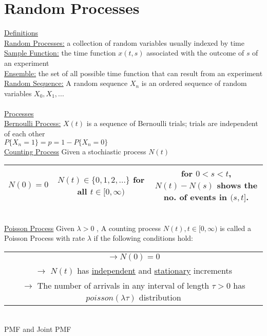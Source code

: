 \documentclass{article}
\begin{document}
	\section*{Random Processes}
	\underline{Definitions}
	\\
	\underline{Random Processes:} a collection of random variables usually indexed by time
	\\
	\underline{Sample Function:} the time function  $x(t, s)$ associated with the outcome of $s$ of an experiment
	\\
	\underline{Ensemble:} the set of all possible time function that can result from an experiment
	\\
	\underline{Random Sequence:} A random sequence $X_n$ is an ordered sequence of random variables $X_0, X_1, ...$ 
	\\
	\\
	\underline{Processes}
	\\
	\underline{Bernoulli Process:} $X(t)$ is a sequence of Bernoulli trials; trials are independent of each other
	\\
	$P\{X_n = 1\} = p = 1 - P\{X_n = 0\}$
	\\
	\underline{Counting Process} Given a stochiastic process $N(t)$
	\\
	\begin{tabular}{|c|c|c|}
		\hline 
		$N(0) = 0$ &
		$N(t) \in \{0, 1, 2,...\}$ for all $t \in [0, \infty)$ &
		for $0 < s < t$, $N(t) - N(s)$ shows the no. of events in $(s,t]$.\\
		\hline
	\end{tabular}
	\\
	\underline{Poisson Process} Given $\lambda > 0$ , A counting process $N(t), t \in [0, \infty)$ is called a Poisson Process with rate $\lambda$ if the following conditions hold:
	\\
	\begin{tabular}{|c|}
		\hline $\to N(0) = 0$ \\ 
		$\to$ $N(t)$ has \underline{independent} and \underline{stationary} increments \\ 
		$\to$ The number of arrivals in any interval of length $\tau > 0$ has $poisson(\lambda\tau)$ distribution\\
		\hline
	\end{tabular}
	\\
	PMF and Joint PMF
	\\
\end{document}

